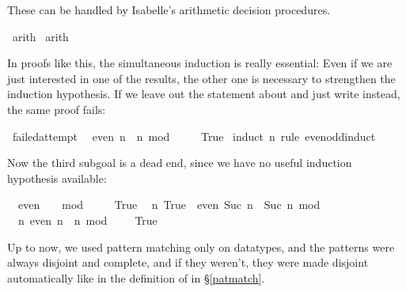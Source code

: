 \begin{isabellebody}
\begin{isamarkuptxt}
  \noindent These can be handled by Isabelle's arithmetic decision procedures.%
\end{isamarkuptxt}%
\isamarkuptrue%
\isamarkupfalse%
\ arith\isanewline
{}\isamarkupfalse%
\ arith\isanewline
{}\isamarkupfalse%
%
\endisatagproof
{\isafoldproof}%
%
\isadelimproof
%
\endisadelimproof
%
\begin{isamarkuptext}%
In proofs like this, the simultaneous induction is really essential:
  Even if we are just interested in one of the results, the other
  one is necessary to strengthen the induction hypothesis. If we leave
  out the statement about  and just write  instead,
  the same proof fails:%
\end{isamarkuptext}%
\isamarkuptrue%
\isamarkupfalse%
\ failed{\isacharunderscore}attempt{\isacharcolon}\isanewline
\ \ {\isachardoublequoteopen}even\ n\ {\isacharequal}\ {\isacharparenleft}n\ mod\ {}\ {\isacharequal}\ {}{\isacharparenright}{\isachardoublequoteclose}\isanewline
\ \ {\isachardoublequoteopen}True{\isachardoublequoteclose}\isanewline
%
\isadelimproof
%
\endisadelimproof
%
\isatagproof
{}\isamarkupfalse%
\ {\isacharparenleft}induct\ n\ rule{\isacharcolon}\ even{\isacharunderscore}odd{\isachardot}induct{\isacharparenright}%
\begin{isamarkuptxt}%
\noindent Now the third subgoal is a dead end, since we have no
  useful induction hypothesis available:

  \begin{isabelle}%
\ {}{\isachardot}\ even\ {}\ {\isacharequal}\ {\isacharparenleft}{}\ mod\ {}\ {\isacharequal}\ {}{\isacharparenright}\isanewline
\ {}{\isachardot}\ True\isanewline
\ {}{\isachardot}\ {\isasymAnd}n{\isachardot}\ True\ {\isasymLongrightarrow}\ even\ {\isacharparenleft}Suc\ n{\isacharparenright}\ {\isacharequal}\ {\isacharparenleft}Suc\ n\ mod\ {}\ {\isacharequal}\ {}{\isacharparenright}\isanewline
\ {}{\isachardot}\ {\isasymAnd}n{\isachardot}\ even\ n\ {\isacharequal}\ {\isacharparenleft}n\ mod\ {}\ {\isacharequal}\ {}{\isacharparenright}\ {\isasymLongrightarrow}\ True%
\end{isabelle}%
\end{isamarkuptxt}%
\isamarkuptrue%
\isamarkupfalse%
%
\endisatagproof
{\isafoldproof}%
%
\isadelimproof
%
\endisadelimproof
%
\isamarkuptrue%
%
\begin{isamarkuptext}%
\label{genpats}%
\end{isamarkuptext}%
\isamarkuptrue%
%
\isamarkuptrue%
%
\begin{isamarkuptext}%
Up to now, we used pattern matching only on datatypes, and the
  patterns were always disjoint and complete, and if they weren't,
  they were made disjoint automatically like in the definition of
   in \S\ref{patmatch}.


\end{isamarkuptext}
\end{isabellebody}

